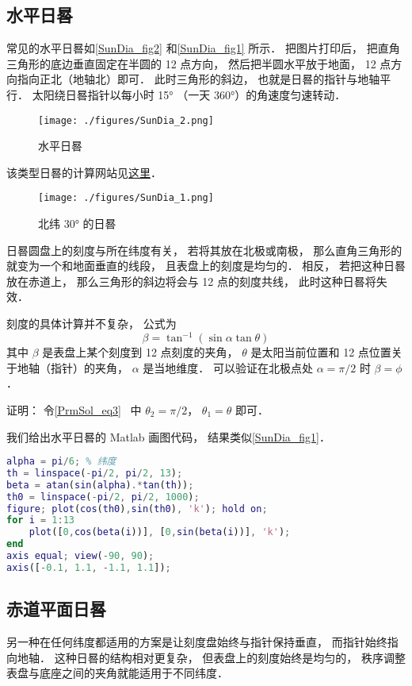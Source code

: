 
\subsection{水平日晷}
常见的水平日晷如\autoref{SunDia_fig2} 和\autoref{SunDia_fig1} 所示． 把图片打印后， 把直角三角形的底边垂直固定在半圆的 12 点方向， 然后把半圆水平放于地面， 12 点方向指向正北（地轴北）即可． 此时三角形的斜边， 也就是日晷的指针与地轴平行． 太阳绕日晷指针以每小时 15° （一天 360°）的角速度匀速转动．

\begin{figure}[ht]
\centering
\texttt{[image: ./figures/SunDia\_2.png]}
\caption{水平日晷} \label{SunDia_fig2}
\end{figure}
该类型日晷的计算网站见\href{https://www.blocklayer.com/sundial.aspx}{这里}．
\begin{figure}[ht]
\centering
\texttt{[image: ./figures/SunDia\_1.png]}
\caption{北纬 30° 的日晷} \label{SunDia_fig1}
\end{figure}

日晷圆盘上的刻度与所在纬度有关， 若将其放在北极或南极， 那么直角三角形的就变为一个和地面垂直的线段， 且表盘上的刻度是均匀的． 相反， 若把这种日晷放在赤道上， 那么三角形的斜边将会与 12 点的刻度共线， 此时这种日晷将失效．

刻度的具体计算并不复杂， 公式为
\begin{equation}
\beta = \tan^{-1}(\sin\alpha \tan \theta)
\end{equation}
其中 $\beta$ 是表盘上某个刻度到 12 点刻度的夹角， $\theta$ 是太阳当前位置和 12 点位置关于地轴（指针）的夹角， $\alpha$ 是当地维度． 可以验证在北极点处 $\alpha = \pi/2$ 时 $\beta = \phi$．

证明： 令\autoref{PrmSol_eq3}~ 中 $\theta_2 = \pi/2$， $\theta_1 = \theta$ 即可．

我们给出水平日晷的 Matlab 画图代码， 结果类似\autoref{SunDia_fig1}．
\begin{lstlisting}[language=matlab, caption=sunDial.m]
alpha = pi/6; % 纬度
th = linspace(-pi/2, pi/2, 13);
beta = atan(sin(alpha).*tan(th));
th0 = linspace(-pi/2, pi/2, 1000);
figure; plot(cos(th0),sin(th0), 'k'); hold on;
for i = 1:13
    plot([0,cos(beta(i))], [0,sin(beta(i))], 'k');
end
axis equal; view(-90, 90);
axis([-0.1, 1.1, -1.1, 1.1]);
\end{lstlisting}

\subsection{赤道平面日晷}
另一种在任何纬度都适用的方案是让刻度盘始终与指针保持垂直， 而指针始终指向地轴． 这种日晷的结构相对更复杂， 但表盘上的刻度始终是均匀的， 秩序调整表盘与底座之间的夹角就能适用于不同纬度．
